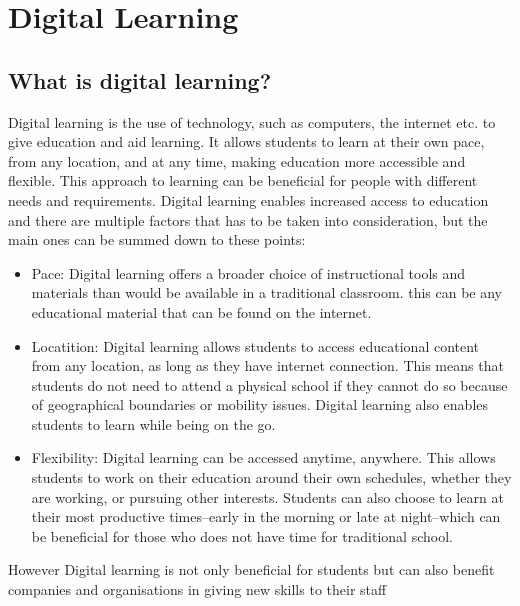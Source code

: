 \chapter{Digital Learning}\label{ch:digitalLearning}
\section{What is digital learning?}\label{ch:whatIsDigitalLearning}

Digital learning is the use of technology, such as computers, the internet etc. to give education and aid learning. It allows students to learn at their own pace, from any location, and at any time, making education more accessible and flexible. 
This approach to learning can be beneficial for people with different needs and requirements. Digital learning enables increased access to education and there are multiple factors that has to be taken into consideration, but the main ones can be summed down to these points\cite{gosa2023}:

\begin{itemize}
\item Pace:
	Digital learning offers a broader choice of instructional tools and materials than would be available in a traditional classroom. this can be any educational material that can be found on the internet.\cite{gosa2023}
\item Locatition:
	  Digital learning allows students to access educational content from any location, as long as they have internet connection. This means that students do not need to attend a physical school if they cannot do so because of geographical boundaries or mobility issues. Digital learning also enables students to learn while being on the go.\cite{gosa2023}
\item Flexibility:
	Digital learning can be accessed anytime, anywhere. This allows students to work on their education around their own schedules, whether they are working, or pursuing other interests. Students can also choose to learn at their most productive times--early in the morning or late at night--which can be  beneficial for those who does not have time for traditional school.\cite{gosa2023}
\end{itemize}

However Digital learning is not only beneficial for students but can also benefit companies and organisations in giving new skills to their staff\cite{SkillsDigitalLearning}

